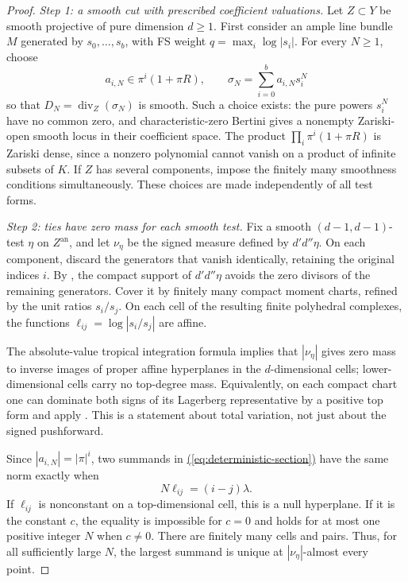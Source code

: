 \documentclass[11pt]{amsart}
\theoremstyle{definition}
\theoremstyle{remark}
\numberwithin{equation}{section}
\newcommand{\ddc}{d'd''}
\newcommand{\an}{\mathrm{an}}
\renewcommand{\eqref}[1]{%
 \begingroup\hypersetup{linkcolor=equationviolet}%
 \hyperref[#1]{\textup{(\ref*{#1})}}%
 \endgroup}
\DeclareMathOperator{\divisor}{div}
\begin{document}
\begin{proof}
\emph{Step 1: a smooth cut with prescribed coefficient valuations.}
Let \(Z\subset Y\) be smooth projective of pure dimension \(d\geq1\).
First consider an ample line bundle \(M\) generated by
\(s_0,\ldots,s_b\), with FS weight \(q=\max_i\log|s_i|\).
For every \(N\geq1\), choose
\begin{equation}\label{eq:deterministic-section}
 a_{i,N}\in\pi^i(1+\pi R),\qquad
 \sigma_N=\sum_{i=0}^b a_{i,N}s_i^N
\end{equation}
so that \(D_N=\divisor_Z(\sigma_N)\) is smooth.
Such a choice exists: the pure powers \(s_i^N\) have no common
zero, and characteristic-zero Bertini gives a nonempty Zariski-open
smooth locus in their coefficient space. The product
\(\prod_i\pi^i(1+\pi R)\) is Zariski dense, since a nonzero polynomial
cannot vanish on a product of infinite subsets of \(K\).
If \(Z\) has several components, impose the finitely many smoothness
conditions simultaneously. These choices are made independently
of all test forms.

\emph{Step 2: ties have zero mass for each smooth test.}
Fix a smooth \((d-1,d-1)\)-test \(\eta\) on \(Z^\an\), and let
\(\nu_\eta\) be the signed measure defined by \(\ddc\eta\).
On each component, discard the generators that vanish identically,
retaining the original indices \(i\).
By \cite[Lemma 3.2.5]{CLD12}, the compact support of \(\ddc\eta\)
avoids the zero divisors of the remaining generators.
Cover it by finitely many compact moment charts, refined by the
unit ratios \(s_i/s_j\). On each cell of the resulting finite
polyhedral complexes, the functions
\(\ell_{ij}=\log|s_i/s_j|\) are affine.

The absolute-value tropical integration formula
\cite[Section 3.7 and Proposition 3.7.2]{CLD12}
implies that \(|\nu_\eta|\) gives zero mass to inverse images of
proper affine hyperplanes in the \(d\)-dimensional cells;
lower-dimensional cells carry no top-degree mass.
Equivalently, on each compact chart one can dominate both signs
of its Lagerberg representative by a positive top form and apply
\cite[Proposition 11.1(3)]{GJRforms}. This is a statement about
total variation, not just about the signed pushforward.

Since \(|a_{i,N}|=|\pi|^i\), two summands in
\eqref{eq:deterministic-section} have the same norm exactly when
\[
 N\ell_{ij}=(i-j)\lambda.
\]
If \(\ell_{ij}\) is nonconstant on a top-dimensional cell, this
is a null hyperplane. If it is the constant \(c\), the equality
is impossible for \(c=0\) and holds for at most one positive
integer \(N\) when \(c\ne0\).
There are finitely many cells and pairs. Thus, for all sufficiently
large \(N\), the largest summand is unique at
\(|\nu_\eta|\)-almost every point.


\end{proof}
\end{document}
